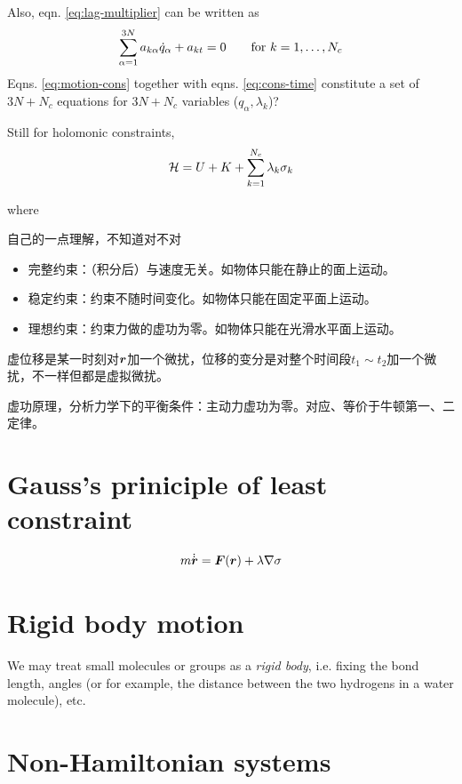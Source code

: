 Also, eqn. \ref{eq:lag-multiplier} can be written as
\begin{equation}
	\sum_{\alpha=1}^{3N} a_{k\alpha}\dot{q}_\alpha+a_{kt}=0
	\qquad \text{for}\ k=1,\dots,N_c
	\label{eq:cons-time}
\end{equation}
Eqns. \ref{eq:motion-cons} together with eqns. \ref{eq:cons-time} constitute a set of $3N+N_c$ equations for $3N+N_c$ variables ($q_\alpha, \lambda_k$)?

Still for holomonic constraints,
\begin{equation}
	\mathcal{H}=U+K+\sum_{k=1}^{N_c}\lambda_k\sigma_k
\end{equation}

where





\supplement 自己的一点理解，不知道对不对

\begin{itemize}
	\item 完整约束：（积分后）与速度无关。如物体只能在静止的面上运动。
	\item 稳定约束：约束不随时间变化。如物体只能在固定平面上运动。
	\item 理想约束：约束力做的虚功为零。如物体只能在光滑水平面上运动。
\end{itemize}

虚位移是某一时刻对$\boldsymbol{r}$加一个微扰，位移的变分是对整个时间段$t_1\sim t_2$加一个微扰，不一样但都是虚拟微扰。

虚功原理，分析力学下的平衡条件：主动力虚功为零。对应、等价于牛顿第一、二定律。

\section{Gauss's priniciple of least constraint}

\begin{equation}
	m\dot{\dot{\boldsymbol{r}}}=\boldsymbol{F}(\boldsymbol{r})+\lambda\nabla\sigma
\end{equation}

\section{Rigid body motion}
We may treat small molecules or groups as a \textit{rigid body}, i.e. fixing the bond length, angles (or for example, the distance between the two hydrogens in a water molecule), etc.


\section{Non-Hamiltonian systems}


